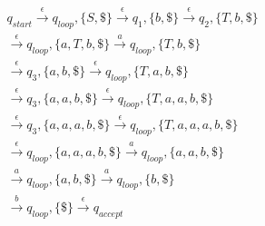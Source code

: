 \begin{frame}[allowframebreaks]
\begin{itemize}
\begin{eqnarray*}
&& q_{start} \stackrel{\epsilon}{\rightarrow}
q_{loop}, \{S,\$\} 
\stackrel{\epsilon}{\rightarrow} q_1, \{b,\$\}
\stackrel{\epsilon}{\rightarrow} q_2, \{T,b,\$\} \\
&& \stackrel{\epsilon}{\rightarrow} q_{loop}, \{a,T,b,\$\} 
\stackrel{a}{\rightarrow}
 q_{loop}, \{T,b,\$\} \\
&& \stackrel{\epsilon}{\rightarrow} q_{3}, \{a, b,\$\} 
\stackrel{\epsilon}{\rightarrow} q_{loop}, \{T,a,b,\$\}\\
&& \stackrel{\epsilon}{\rightarrow} q_3, \{a,a,b,\$\}
\stackrel{\epsilon}{\rightarrow} q_{loop}, \{T,a,a,b,\$\}\\
&& \stackrel{\epsilon}{\rightarrow} q_3, \{a,a,a,b,\$\}
\stackrel{\epsilon}{\rightarrow} q_{loop}, \{T,a,a,a,b,\$\}\\
&& \stackrel{\epsilon}{\rightarrow} q_{loop}, \{a,a,a,b,\$\}
\stackrel{a}{\rightarrow} q_{loop}, \{a,a,b,\$\}\\
&& \stackrel{a}{\rightarrow} q_{loop},\{a,b,\$\}
\stackrel{a}{\rightarrow} q_{loop}, \{b,\$\}\\
&& \stackrel{b}{\rightarrow} q_{loop}, \{\$\}
\stackrel{\epsilon}{\rightarrow} q_{accept}
\end{eqnarray*}



\end{itemize}\end{frame}



